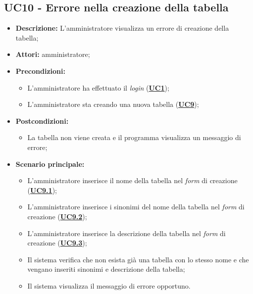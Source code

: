 \subsection{UC10 - Errore nella creazione della tabella}
\label{sec:UC10}
\begin{itemize}
	\item \textbf{Descrizione:} L’amministratore visualizza un errore di creazione della tabella;
	\item \textbf{Attori:} amministratore;
	\item \textbf{Precondizioni:} 
	\begin{itemize}
		\item L’amministratore ha effettuato il \textit{login} (\hyperref[sec:UC1]{\textbf{UC1}});
		\item L’amministratore sta creando una nuova tabella (\hyperref[sec:UC9]{\textbf{UC9}});
	\end{itemize}
	\item \textbf{Postcondizioni:} 
	\begin{itemize}
		\item La tabella non viene creata e il programma visualizza un messaggio di errore;
	\end{itemize}
	\item \textbf{Scenario principale:} 
	\begin{itemize}
		\item L’amministratore inserisce il nome della tabella nel \textit{form} di creazione (\hyperref[sec:UC9.1]{\textbf{UC9.1}});
		\item L’amministratore inserisce i sinonimi del nome della tabella nel \textit{form} di creazione (\hyperref[sec:UC9.2]{\textbf{UC9.2}});
		\item L’amministratore inserisce la descrizione della tabella nel \textit{form} di creazione (\hyperref[sec:UC9.3]{\textbf{UC9.3}});
		\item Il sistema verifica che non esista già una tabella con lo stesso nome e che vengano inseriti sinonimi e descrizione della tabella;
		\item Il sistema visualizza il messaggio di errore opportuno.
	\end{itemize}
\end{itemize}

